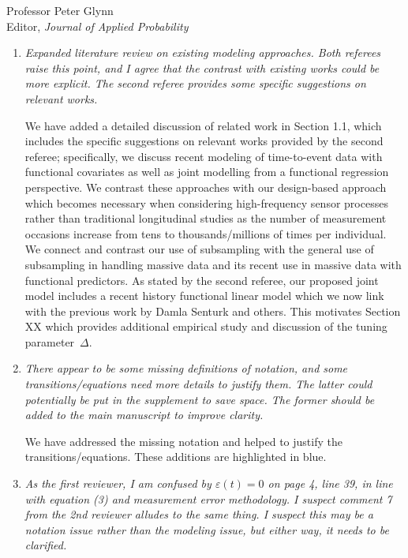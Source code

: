 \documentclass[11pt]{letter} %
\begin{document}
\begin{letter}{Professor
	Peter Glynn\\
	Editor, {\em Journal of Applied Probability}}
\begin{enumerate}
\item {\it Expanded literature review on existing modeling approaches. Both referees raise this point, and I agree that the contrast with existing works could be more explicit. The second referee provides some specific suggestions on relevant works.}

\vspace{5mm}
We have added a detailed discussion of related work in Section 1.1, which includes the specific suggestions on relevant works provided by the second referee; specifically, we discuss recent modeling of time-to-event data with functional covariates as well as joint modelling from a functional regression perspective.  We contrast these approaches with our design-based approach which becomes necessary when considering high-frequency sensor processes rather than traditional longitudinal studies as the number of measurement occasions increase from tens to thousands/millions of times per individual.  We connect and contrast our use of subsampling with the general use of subsampling in handling massive data and its recent use in massive data with functional predictors.  As stated by the second referee, our proposed joint model includes a recent history functional linear model which we now link with the previous work by Damla Senturk and others.  This motivates Section XX which provides additional empirical study and discussion of the tuning parameter~$\Delta$.
\vspace{5mm}

\item {\it There appear to be some missing definitions of notation, and some transitions/equations need more details to justify them. The latter could potentially be put in the supplement to save space. The former should be added to the main manuscript to improve clarity.}

\vspace{5mm}
We have addressed the missing notation and helped to justify the transitions/equations.  These additions are highlighted in blue.
\vspace{5mm}

\item {\it As the first reviewer, I am confused by $\varepsilon(t) = 0$ on page 4, line 39, in line with equation (3) and measurement error methodology. I suspect comment 7 from the 2nd reviewer alludes to the same thing. I suspect this may be a notation issue rather than the modeling issue, but either way, it needs to be clarified.}


\end{enumerate}
\end{letter}
\end{document}
